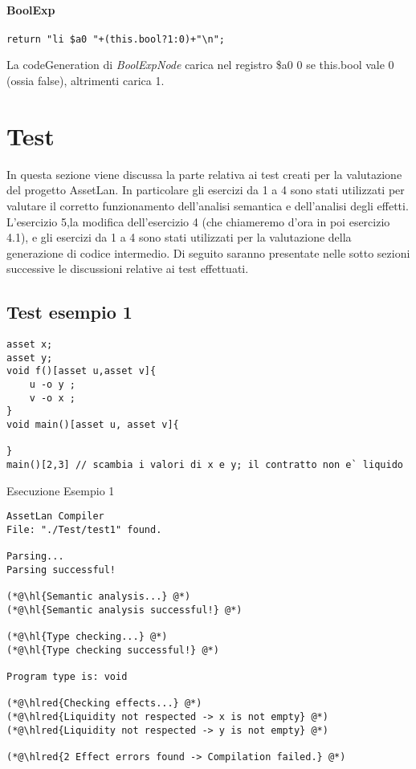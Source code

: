 \documentclass[12pt,twoside,openright,a4paper]{report}
\DeclareRobustCommand{\hlred}[1]{{\sethlcolor{red}\hl{#1}}}
\begin{document}
\subsubsection{BoolExp}
\begin{lstlisting}
return "li $a0 "+(this.bool?1:0)+"\n";
\end{lstlisting}
La codeGeneration di \textit{BoolExpNode} carica nel registro \$a0 0 se this.bool vale 0 (ossia false), altrimenti carica 1.

\chapter{Test}
In questa sezione viene discussa la parte relativa ai test creati per la valutazione del progetto AssetLan. In particolare gli esercizi da 1 a 4 sono stati utilizzati per valutare il corretto funzionamento dell'analisi semantica e dell'analisi degli effetti. L'esercizio 5,la modifica dell'esercizio 4 (che chiameremo d'ora in poi esercizio 4.1), e gli esercizi da 1 a 4 sono stati utilizzati per la valutazione della generazione di codice intermedio. Di seguito saranno presentate nelle sotto sezioni successive le discussioni relative ai test effettuati.

\section{Test esempio 1}

\begin{lstlisting}
asset x;
asset y;
void f()[asset u,asset v]{
    u -o y ;
    v -o x ;
}
void main()[asset u, asset v]{

}
main()[2,3]	// scambia i valori di x e y; il contratto non e` liquido
\end{lstlisting}
\newpage
Esecuzione Esempio 1
\begin{lstlisting}
AssetLan Compiler
File: "./Test/test1" found.

Parsing...
Parsing successful!

(*@\hl{Semantic analysis...} @*)
(*@\hl{Semantic analysis successful!} @*)

(*@\hl{Type checking...} @*)
(*@\hl{Type checking successful!} @*)

Program type is: void

(*@\hlred{Checking effects...} @*)
(*@\hlred{Liquidity not respected -> x is not empty} @*)
(*@\hlred{Liquidity not respected -> y is not empty} @*)

(*@\hlred{2 Effect errors found -> Compilation failed.} @*)
\end{lstlisting}
\end{document}
